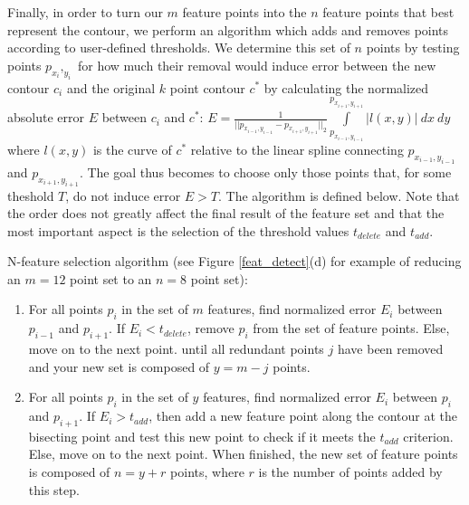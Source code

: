 \documentclass[paper=a4, fontsize=11pt]{scrartcl} %
\begin{document}

Finally, in order to turn our $m$ feature points into the $n$ feature points that best represent the contour, we perform an algorithm which adds and removes points according to user-defined thresholds. We determine this set of $n$ points by testing points $p_{x_i},_{y_i}$ for how much their removal would induce error between the new contour $c_i$ and the original $k$ point contour $c^*$ by calculating the normalized absolute error $E$ between $c_i$ and $c^*$: $E = \frac{1}{|| p_{x_{i-1},y_{i-1}}  -  p_{x_{i+1},y_{i+1}} ||_2} \int\limits_{p_{x_{i-1},y_{i-1}}}^{p_{x_{i+1},y_{i+1}}} |l(x,y)| \ dx \ dy$ where $l(x,y)$ is the curve of $c^*$ relative to the linear spline connecting $p_{x_{i-1},y_{i-1}}$ and $p_{x_{i+1},y_{i+1}}$. The goal thus becomes to choose only those points that, for some theshold $T$, do not induce error $E > T$. The algorithm is defined below. Note that the order does not greatly affect the final result of the feature set and that the most important aspect is the selection of the threshold values $t_{delete}$ and $t_{add}$. 

N-feature selection algorithm (see Figure \ref{feat_detect}(d) for example of reducing an $m = 12$ point set to an $n = 8$ point set): 
\begin{enumerate}
	\item 
	For all points $p_i$ in the set of $m$ features, find normalized error $E_i$ between $p_{i-1}$ and $p_{i+1}$. If $E_i < t_{delete}$, remove $p_i$ from the set of feature points. Else, move on to the next point. until all redundant points $j$ have been removed and your new set is composed of $y = m - j$ points.  
	\item
	For all points $p_i$ in the set of $y$ features, find normalized error $E_i$ between $p_{i}$ and $p_{i+1}$. If $E_i > t_{add}$, then add a new feature point along the contour at the bisecting point and test this new point to check if it meets the $t_{add}$ criterion. Else, move on to the next point. When finished, the new set of feature points is composed of $n = y + r$ points, where $r$ is the number of points added by this step. 
\end{enumerate}

\end{document}
